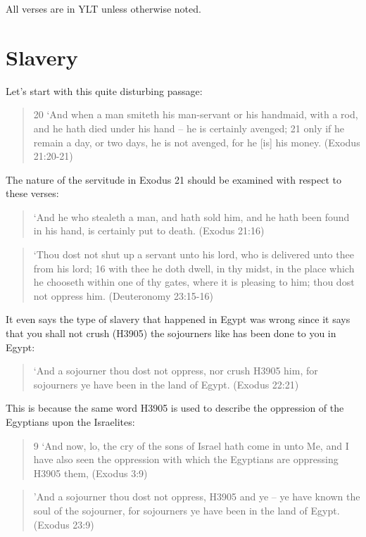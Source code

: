 \documentclass[11pt]{article}
\begin{document}
All verses are in YLT unless otherwise noted.

\section{Slavery}
Let's start with this quite disturbing passage:
\begin{quote}
20 `And when a man smiteth his man-servant or his handmaid, with a rod, and he hath died under his hand -- he is certainly avenged;
21 only if he remain a day, or two days, he is not avenged, for he [is] his money. (Exodus 21:20-21)
\end{quote}


The nature of the servitude in Exodus 21 should be examined with respect to these verses:
\begin{quote}
`And he who stealeth a man, and hath sold him, and he hath been found in his hand, is certainly put to death. (Exodus 21:16)
\end{quote} 
 
\begin{quote}
`Thou dost not shut up a servant unto his lord, who is delivered unto thee from his lord;
16 with thee he doth dwell, in thy midst, in the place which he chooseth within one of thy gates, where it is pleasing to him; thou dost not oppress him. (Deuteronomy 23:15-16)
\end{quote} 

It even says the type of slavery that happened in Egypt was wrong since it says that you shall not crush (H3905) the sojourners like has been done to you in Egypt:
\begin{quote}
`And a sojourner thou dost not oppress, nor crush H3905 him, for sojourners ye have been in the land of Egypt. (Exodus 22:21)
\end{quote}

This is because the same word H3905 is used to describe the oppression of the Egyptians upon the Israelites:
\begin{quote}
9 `And now, lo, the cry of the sons of Israel hath come in unto Me, and I have also seen the oppression with which the Egyptians are oppressing H3905 them, (Exodus 3:9)
\end{quote}

\begin{quote}
'And a sojourner thou dost not oppress, H3905 and ye -- ye have known the soul of the sojourner, for sojourners ye have been in the land of Egypt. (Exodus 23:9)
\end{quote}
\end{document}

